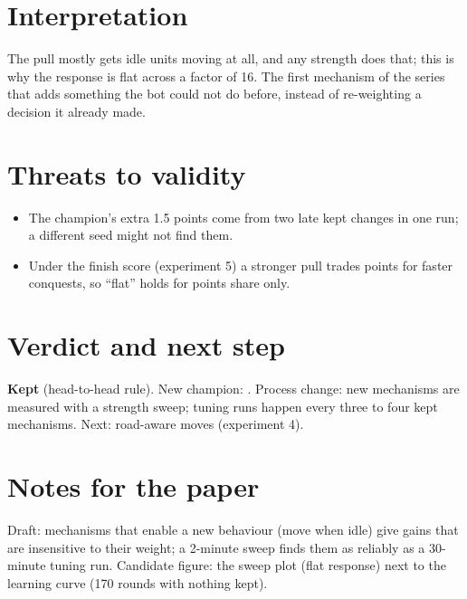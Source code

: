 \documentclass{../polyexp}
\begin{document}
\section{Interpretation}
The pull mostly gets idle units moving at all, and any strength does that; this is why the response is flat across a factor of 16. The first mechanism of the series that adds something the bot could not do before, instead of re-weighting a decision it already made.


\section{Threats to validity}
\begin{itemize}
\item The champion's extra 1.5 points come from two late kept changes in one run; a different seed might not find them.
\item Under the finish score (experiment 5) a stronger pull trades points for faster conquests, so ``flat'' holds for points share only.
\end{itemize}

\section{Verdict and next step}
\textbf{Kept} (head-to-head rule). New champion: . Process change: new mechanisms are measured with a strength sweep; tuning runs happen every three to four kept mechanisms. Next: road-aware moves (experiment 4).

\section{Notes for the paper}
Draft: mechanisms that enable a new behaviour (move when idle) give gains that are insensitive to their weight; a 2-minute sweep finds them as reliably as a 30-minute tuning run. Candidate figure: the sweep plot (flat response) next to the learning curve (170 rounds with nothing kept).

\end{document}

